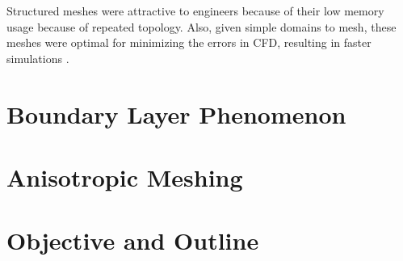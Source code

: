 Structured meshes were attractive to engineers because of their low memory usage because of repeated topology. Also, given simple domains to mesh, these meshes were optimal for minimizing the errors in CFD, resulting in faster simulations \cite{d1991optimal}.

\section{Boundary Layer Phenomenon}

\section{Anisotropic Meshing}

\section{Objective and Outline}